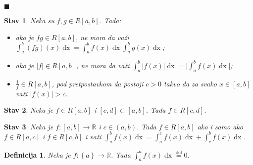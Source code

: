 \documentclass{article}
\newtheorem{definicija}{Definicija}[section]
\newtheorem{stav}{Stav}[section]
\DeclareMathOperator{\dx}{dx}
\begin{document}
\null\hfill $\blacksquare$\par

\begin{stavbox}
    \label{stav_2.5}
    \begin{stav}
        Neka su $f, g \in R\left[a, b\right]$. Tada:
        \begin{itemize}
            \item ako je $fg \in R\left[a, b\right]$, ne mora da važi $\displaystyle \int^b_a \left(fg\right)\left(x\right)\dx = \int^b_af\left(x\right)\dx  \int^b_ag\left(x\right)\dx$;
            \item ako je $|f|\in R\left[a, b\right]$, ne mora da važi $\displaystyle \int^b_a \big|f\left(x\right)\big|\dx = \bigg|\int^b_a f\left(x\right)\dx\bigg| $;
            \item $\frac{1}{f} \in R\left[a, b\right]$, pod pretpostavkom da postoji $c > 0$ takvo da za svako $x \in \left[a, b\right]$ važi $|f\left(x\right)| > c$.
        \end{itemize}
    \end{stav}
\end{stavbox}

\begin{stavbox}
    \label{stav_2.6}
    \begin{stav}
        Neka je $f\in R\left[a, b\right]$ i $\left[c, d\right] \subset \left[a, b\right]$. Tada $f\in R\left[c,d\right]$.
    \end{stav}
\end{stavbox}

\begin{stavbox}
    \label{stav_2.7}
    \begin{stav}
        Neka je $f:\left[a,b\right] \longrightarrow \mathbb{R}$ i $c \in \left(a, b\right)$. Tada $f\in R\left[a,b\right]$ ako i samo ako $f \in R\left[a, c\right]$ i $f\in R\left[c, b\right]$ i važi
        $\displaystyle\int^b_a f\left(x\right)\dx = \int^c_a f\left(x\right)\dx + \int^b_c f\left(x\right)\dx$.
    \end{stav}
\end{stavbox}

\begin{defbox}
    \label{definicija_2.10}
    \begin{definicija}
        Neka je $f:\left\{a\right\} \longrightarrow \mathbb{R}$. Tada
        $\displaystyle\int^a_a f\left(x\right)\dx \overset{\text{def}}{=} 0$.
    \end{definicija}
\end{defbox}
\end{document}
